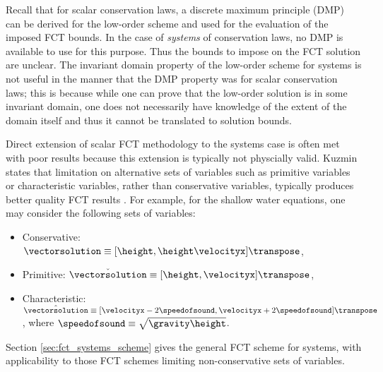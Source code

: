 Recall that for scalar conservation laws, a discrete maximum principle (DMP) can
be derived for the low-order scheme and used for the evaluation of the
imposed FCT bounds. In the case of \emph{systems} of conservation laws,
no DMP is available to use for this purpose. Thus the bounds to impose on
the FCT solution are unclear. The invariant domain property of the low-order
scheme for systems is not useful in the manner that the DMP property was
for scalar conservation laws; this is because while one can prove that the
low-order solution is in some invariant domain, one does not necessarily
have knowledge of the extent of the domain itself and thus it cannot
be translated to solution bounds.

Direct extension of scalar FCT methodology to the systems case is often met
with poor results because this extension is typically not physcially valid.
Kuzmin states that limitation on alternative sets of variables such as
primitive variables or characteristic variables, rather than conservative
variables, typically produces better quality FCT results \cite{kuzmin_FCT}.
For example, for the shallow water equations, one may consider the
following sets of variables:
\begin{itemize}
  \item Conservative:
    $\vectorsolution \equiv [\height,\height\velocityx]\transpose$,
  \item Primitive:
    $\check{\vectorsolution} \equiv [\height,\velocityx]\transpose$,
  \item Characteristic:
    $\hat{\vectorsolution} \equiv [\velocityx-2\speedofsound,
      \velocityx+2\speedofsound]\transpose$,
      where $\speedofsound\equiv\sqrt{\gravity\height}$.
\end{itemize}
Section \ref{sec:fct_systems_scheme} gives the general FCT scheme for systems,
with applicability to those FCT schemes limiting non-conservative sets of
variables.
